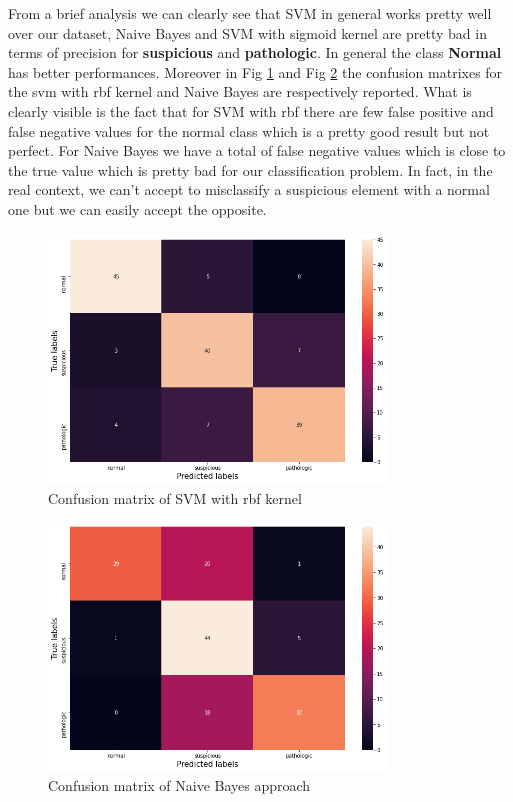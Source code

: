 \documentclass[a4paper,12pt]{article}
\begin{document}
\noindent From a brief analysis we can clearly see that SVM in general works pretty well over our dataset, Naive Bayes and SVM with sigmoid kernel are pretty bad in terms of precision for \textbf{suspicious} and \textbf{pathologic}. In general the class \textbf{Normal} has better performances. Moreover in Fig \ref{fig:confusion_svm} and Fig \ref{fig:confusion_bayes} the confusion matrixes for the svm with rbf kernel and Naive Bayes are respectively reported. What is clearly visible is the fact that for SVM with rbf there are few false positive and false negative values for the normal class which is a pretty good result but not perfect. For Naive Bayes we have a total of false negative values which is close to the true value which is pretty bad for our classification problem. In fact, in the real context, we can't accept to misclassify a suspicious element with a normal one but we can easily accept the opposite.

\begin{figure}[H]
  \begin{center}
  \includegraphics[width=0.8\textwidth]{images/svm_rbf.png}
  \end{center}
  \caption{Confusion matrix of SVM with rbf kernel}
  \label{fig:confusion_svm}
\end{figure}

\begin{figure}[H]
  \begin{center}
  \includegraphics[width=0.8\textwidth]{images/confusion_naive.png}
  \end{center}
  \caption{Confusion matrix of Naive Bayes approach}
  \label{fig:confusion_bayes}
\end{figure}
\end{document}
